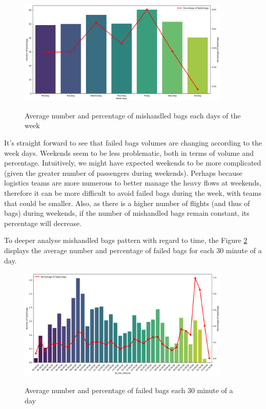 \documentclass[12pt]{article}
\begin{document}
\begin{figure}[h]
    \centering
    \includegraphics[width=0.9\textwidth]{Number and percentage of failed bags within a week.png}\\
    \caption{Average number and percentage of mishandled bags each days of the week}
    \label{fig:Average number and percentage of mishandled bags each days of the week}
\end{figure}
\FloatBarrier

It's straight forward to see that failed bags volumes are changing according to the week days. Weekends seem to be less problematic, both in terms of volume and percentage. Intuitively, we might have expected weekends to be more complicated (given the greater number of passengers during weekends). Perhaps because logistics teams are more numerous to better manage the heavy flows at weekends, therefore it can be more difficult to avoid failed bags during the week, with teams that could be smaller. Also, as there is a higher number of flights (and thus of bags) during weekends, if the number of mishandled bags remain constant, its percentage will decrease.

To deeper analyse mishandled bags pattern with regard to time, the Figure \ref{fig:Average number and percentage of failed bags each 30 minute of a day} displays the average number and percentage of failed bags for each 30 minute of a day.

\begin{figure}[h]
    \centering
    \includegraphics[width=0.9\textwidth]{Number and percentage of failed bags within a day.png}\\
    \caption{Average number and percentage of failed bags each 30 minute of a day}
    \label{fig:Average number and percentage of failed bags each 30 minute of a day}
\end{figure}
\FloatBarrier
\end{document}
